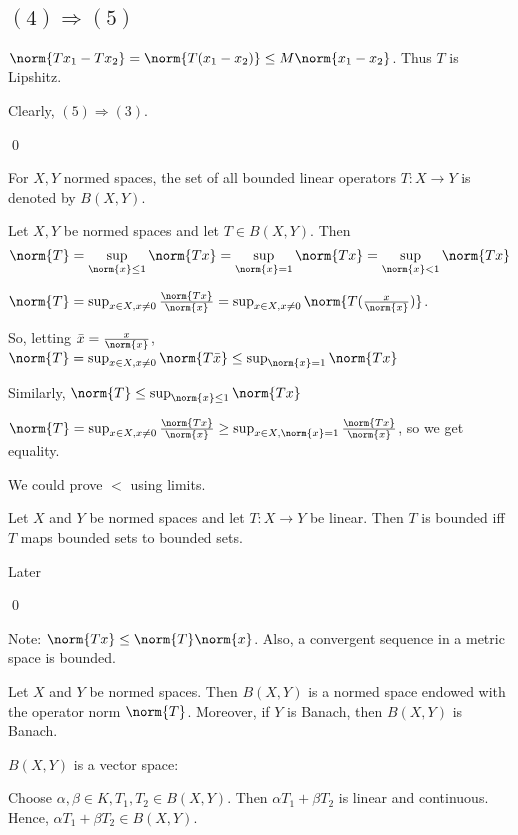\documentclass[x11names,reqno,14pt]{extarticle}
\begin{document}
\subsection*{$(4)\Rightarrow(5)$}

$\norm{Tx_1 - Tx_2} = \norm{T(x_1 - x_2)} \leq M\norm{x_1 - x_2}$. Thus $T$ is Lipshitz. 

Clearly, $(5)\Rightarrow(3)$.

\qed


For $X, Y$ normed spaces, the set of all bounded linear operators $T:X\to Y$ is denoted by $B(X, Y)$. 

\thm Let $X, Y$ be normed spaces and let $T \in B(X, Y)$. Then 
\[
\norm{T} = \sup_{\norm{x}\leq1}\norm{Tx} = \sup_{\norm{x} = 1}\norm{Tx} = \sup_{\norm{x}<1}\norm{Tx}
\]

\proof

$\norm{T} = \sup_{x\in X, x\neq0}\frac{\norm{Tx}}{\norm{x}} = \sup_{x\in X, x \neq 0}\norm{T(\frac{x}{\norm{x}})}$. 

So, letting $\bar{x} = \frac{x}{\norm{x}}$, $\norm{T} = \sup_{x\in X, x\neq0}\norm{T\bar{x}} \leq \sup_{\norm{x}=1}\norm{Tx}$

Similarly, $\norm{T} \leq \sup_{\norm{x}\leq1}\norm{Tx}$

$\norm{T} = \sup_{x\in X, x\neq0}\frac{\norm{Tx}}{\norm{x}} \geq \sup_{x\in X, \norm{x} = 1}\frac{\norm{Tx}}{\norm{x}}$, so we get equality. 

We could prove $<$ using limits. 

\thm 

Let $X$ and $Y$ be normed spaces and let $T:X\to Y$ be linear. Then $T$ is bounded iff $T$ maps bounded sets to bounded sets.

\proof

Later

\qed

Note: $\norm{Tx} \leq \norm{T}\norm{x}$. Also, a convergent sequence in a metric space is bounded. 

\thm Let $X$ and $Y$ be normed spaces. Then $B(X, Y)$ is a normed space endowed with the operator norm $\norm{T}$. Moreover, if $Y$ is Banach, then $B(X, Y)$ is Banach.

\proof

$B(X, Y)$ is a vector space:

Choose $\alpha,\beta \in K, T_1, T_2 \in B(X, Y)$. Then $\alpha T_1 + \beta T_2$ is linear and continuous. Hence, $\alpha T_1 + \beta T_2 \in B(X, Y)$. 
\end{document}
